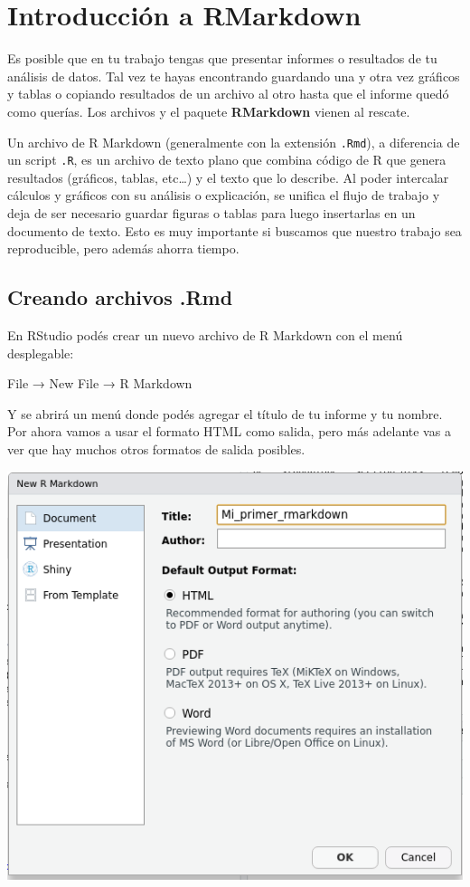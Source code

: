 \documentclass[
  openany]{book}
\begin{document}
\hypertarget{introducciuxf3n-a-rmarkdown}{%
\chapter{Introducción a RMarkdown}\label{introducciuxf3n-a-rmarkdown}}

Es posible que en tu trabajo tengas que presentar informes o resultados de tu análisis de datos.
Tal vez te hayas encontrando guardando una y otra vez gráficos y tablas o copiando resultados de un archivo al otro hasta que el informe quedó como querías.
Los archivos y el paquete \textbf{RMarkdown} vienen al rescate.

Un archivo de R Markdown (generalmente con la extensión \texttt{.Rmd}), a diferencia de un script \texttt{.R}, es un archivo de texto plano que combina código de R que genera resultados (gráficos, tablas, etc\ldots) y el texto que lo describe.
Al poder intercalar cálculos y gráficos con su análisis o explicación, se unifica el flujo de trabajo y deja de ser necesario guardar figuras o tablas para luego insertarlas en un documento de texto.
Esto es muy importante si buscamos que nuestro trabajo sea reproducible, pero además ahorra tiempo.

\hypertarget{creando-archivos-.rmd}{%
\section{Creando archivos .Rmd}\label{creando-archivos-.rmd}}

En RStudio podés crear un nuevo archivo de R Markdown con el menú desplegable:

File → New File → R Markdown

Y se abrirá un menú donde podés agregar el título de tu informe y tu nombre.
Por ahora vamos a usar el formato HTML como salida, pero más adelante vas a ver que hay muchos otros formatos de salida posibles.

\includegraphics{img/nuevo-rmd.png}
\end{document}
